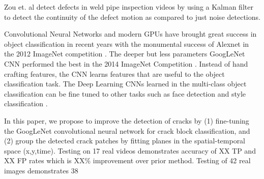 Zou et. al detect defects in weld pipe inspection videos by using a Kalman filter to detect the continuity of the defect motion as compared to just noise detections.   \cite{Zou2015_weldDefect_Kalman}


Convolutional Neural Networks and modern GPUs have brought great success in object classification in recent years with the monumental success of Alexnet in the 2012 ImageNet competition \cite{krizhevsky2012imagenet}.  The deeper but less parameters GoogLeNet CNN performed the best in the 2014 ImageNet Competition \cite{googlenet2014going}. Instead of hand crafting features, the CNN learns features that are useful to the object classification task. The Deep Learning CNNs learned in the multi-class object classification can be fine tuned to other tasks such as face detection \cite{farfade2015multi} and style classification \cite{karayev2013styleRecognizing}.

In this paper, we propose to improve the detection of cracks by (1) fine-tuning the GoogLeNet convolutional neural network for crack block classification, and (2) group the detected crack patches by fitting planes in the spatial-temporal space (x,y,time). Testing on 17 real videos demonstrates accuracy of XX TP and XX FP rates which is XX\% improvement over prior method. Testing of 42 real images demonstrates 38%


